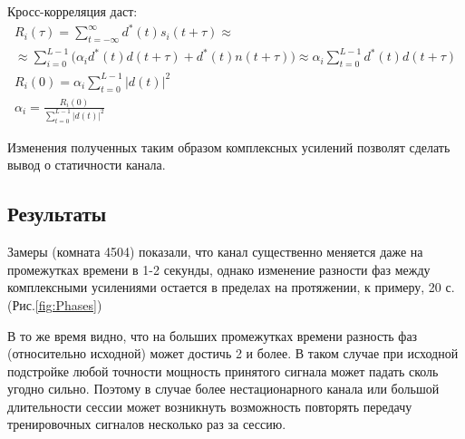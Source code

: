 \documentclass[a4paper,12pt,oneside, abstract=true]{scrartcl}
\begin{document}
Кросс-корреляция даст:
\begin{gather}
R_i\left(\tau\right) = \sum\limits_{t=-\infty}^{\infty}d^*\left(t\right)s_i\left(t+\tau\right) \approx \nonumber \\ 
\approx \sum\limits_{i=0}^{L-1}\bigl(\alpha_i d^*\left(t\right)d\left(t+\tau\right)+d^*\left(t\right)n\left(t+\tau\right)\bigr) \approx 
\alpha_i\sum\limits_{t=0}^{L-1} d^*\left(t\right)d\left(t+\tau\right) \\
R_i\left(0\right) = \alpha_i\sum\limits_{t=0}^{L-1}|d\left(t\right)|^2 \\
\alpha_i = \frac{R_i\left(0\right)}{\sum\limits_{t=0}^{L-1}|d\left(t\right)|^2}
\label{eq:Crosscor}
\end{gather}

Изменения полученных таким образом комплексных усилений позволят сделать вывод о статичности канала.
\subsection{Результаты}
Замеры (комната 4504) показали, что канал существенно меняется даже на промежутках времени в 1-2 секунды, однако изменение разности фаз между комплексными усилениями остается в пределах на протяжении, к примеру, 20 с. (Рис.\ref{fig:Phases})

В то же время видно, что на больших промежутках времени разность фаз (относительно исходной) может достичь 2 и более. В таком случае при исходной подстройке любой точности мощность принятого сигнала может падать сколь угодно сильно. 
Поэтому в случае более нестационарного канала или большой длительности сессии может возникнуть возможность повторять передачу тренировочных сигналов несколько раз за сессию.
\end{document}
